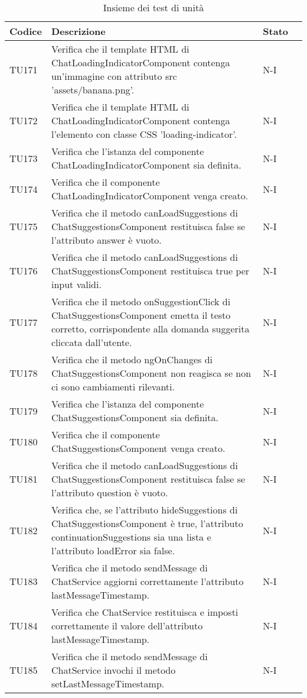 \begin{table}[h!]
    \centering
    \renewcommand{\arraystretch}{1.5}
    \begin{tabularx}{\textwidth}{|p{}|X|p{}|p{}|}\hline
    \rowcolor[HTML]{FFD700}
    \textbf{Codice} & \textbf{Descrizione} & \textbf{Stato} \\ \hline

    TU171 & Verifica che il template HTML di ChatLoadingIndicatorComponent contenga un'immagine con attributo src 'assets/banana.png'. &  N-I \\ \hline
    TU172 & Verifica che il template HTML di ChatLoadingIndicatorComponent contenga l'elemento con classe CSS 'loading-indicator'. &  N-I \\ \hline
    TU173 & Verifica che l'istanza del componente ChatLoadingIndicatorComponent sia definita. &  N-I \\ \hline
    TU174 & Verifica che il componente ChatLoadingIndicatorComponent venga creato. &  N-I \\ \hline
    TU175 & Verifica che il metodo canLoadSuggestions di ChatSuggestionsComponent restituisca false se l'attributo answer è vuoto. &  N-I \\ \hline
    TU176 & Verifica che il metodo canLoadSuggestions di ChatSuggestionsComponent restituisca true per input validi. &  N-I \\ \hline
    TU177 & Verifica che il metodo onSuggestionClick di ChatSuggestionsComponent emetta il testo corretto, corrispondente alla domanda suggerita cliccata dall'utente. &  N-I \\ \hline
    TU178 & Verifica che il metodo ngOnChanges di ChatSuggestionsComponent non reagisca se non ci sono cambiamenti rilevanti. &  N-I \\ \hline
    TU179 & Verifica che l'istanza del componente ChatSuggestionsComponent sia definita. &  N-I \\ \hline
    TU180 & Verifica che il componente ChatSuggestionsComponent venga creato. &  N-I \\ \hline
    TU181 & Verifica che il metodo canLoadSuggestions di ChatSuggestionsComponent restituisca false se l'attributo question è vuoto. &  N-I \\ \hline
    TU182 & Verifica che, se l'attributo hideSuggestions di ChatSuggestionsComponent è true, l'attributo continuationSuggestions sia una lista e l'attributo loadError sia false. &  N-I \\ \hline
    TU183 & Verifica che il metodo sendMessage di ChatService aggiorni correttamente l'attributo lastMessageTimestamp. &  N-I \\ \hline
    TU184 & Verifica che ChatService restituisca e imposti correttamente il valore dell'attributo lastMessageTimestamp. &  N-I \\ \hline
    TU185 & Verifica che il metodo sendMessage di ChatService invochi il metodo setLastMessageTimestamp. &  N-I \\ \hline

    \end{tabularx}
    \caption{Insieme dei test di unità}
\end{table}

